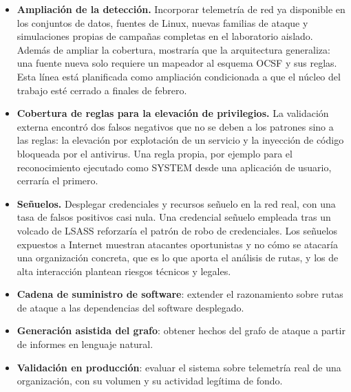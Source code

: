 \begin{itemize}
    \item \textbf{Ampliación de la detección.} Incorporar telemetría de red ya disponible en
    los conjuntos de datos, fuentes de Linux, nuevas familias de ataque y simulaciones propias
    de campañas completas en el laboratorio aislado. Además de ampliar la cobertura, mostraría
    que la arquitectura generaliza: una fuente nueva solo requiere un mapeador al esquema OCSF
    y sus reglas. Esta línea está planificada como ampliación condicionada a que el núcleo del
    trabajo esté cerrado a finales de febrero.
    \item \textbf{Cobertura de reglas para la elevación de privilegios.} La validación externa
    encontró dos falsos negativos que no se deben a los patrones sino a las reglas: la elevación por
    explotación de un servicio y la inyección de código bloqueada por el antivirus. Una regla
    propia, por ejemplo para el reconocimiento ejecutado como SYSTEM desde una aplicación de
    usuario, cerraría el primero.
    \item \textbf{Señuelos.} Desplegar credenciales y recursos señuelo en la red real, con una
    tasa de falsos positivos casi nula. Una credencial señuelo empleada tras un volcado de LSASS
    reforzaría el patrón de robo de credenciales. Los señuelos expuestos a Internet muestran
    atacantes oportunistas y no cómo se atacaría una organización concreta, que es lo que
    aporta el análisis de rutas, y los de alta interacción plantean riesgos técnicos y legales.
    \item \textbf{Cadena de suministro de software}: extender el razonamiento sobre rutas de
    ataque a las dependencias del software desplegado.
    \item \textbf{Generación asistida del grafo}: obtener hechos del grafo de ataque a partir
    de informes en lenguaje natural.
    \item \textbf{Validación en producción}: evaluar el sistema sobre telemetría real de una
    organización, con su volumen y su actividad legítima de fondo.
\end{itemize}
